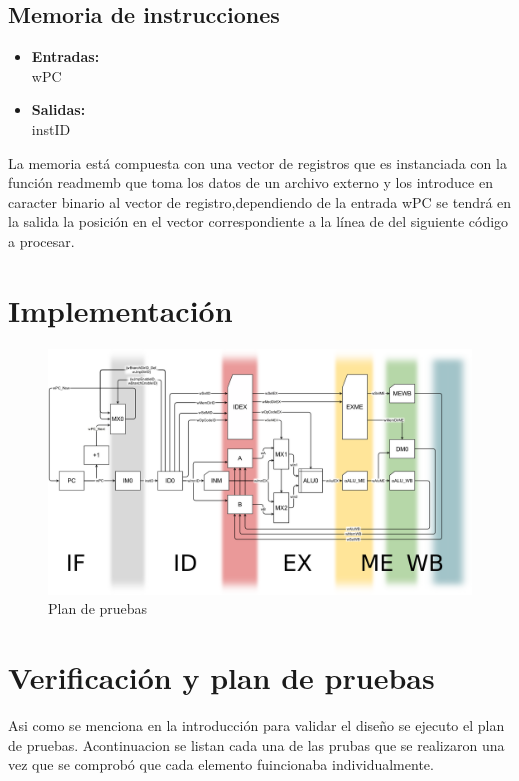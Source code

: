 \documentclass[paper=letter, fontsize=12pt]{article}
\begin{document}
\subsection{Memoria de instrucciones}
\begin{itemize}
\item \textbf{Entradas:}\\
wPC
\item \textbf{Salidas:}\\
instID
\end{itemize}

La memoria está compuesta con una vector de registros que es instanciada con la función readmemb que toma los datos de un archivo externo y los introduce en caracter binario al vector de registro,dependiendo de la entrada wPC se tendrá en la salida la posición en el vector correspondiente a la línea de del siguiente código a procesar.

\pagebreak
\section{Implementación}

\begin{figure}[hbtp]
\centering
\includegraphics[width=1\linewidth]{araucaria_pipeline}
\caption{Plan de pruebas}
\end{figure}

\section{Verificación y plan de pruebas}

Asi como se menciona en la introducción para validar el diseño se ejecuto el plan de pruebas. Acontinuacion se listan cada una de las prubas que se realizaron una vez que se comprobó que cada elemento fuincionaba individualmente.
\end{document}
